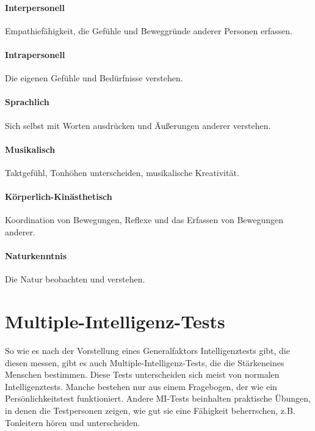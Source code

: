 \paragraph{Interpersonell}
Empathiefähigkeit, die Gefühle und Beweggründe anderer Personen erfassen.
\paragraph{Intrapersonell}
Die eigenen Gefühle und Bedürfnisse verstehen.
\paragraph{Sprachlich}
Sich selbst mit Worten ausdrücken und Äußerungen anderer verstehen.
\paragraph{Musikalisch}
Taktgefühl, Tonhöhen unterscheiden, musikalische Kreativität.
\paragraph{Körperlich-Kinästhetisch}
Koordination von Bewegungen, Reflexe und das Erfassen von Bewegungen anderer.
\paragraph{Naturkenntnis}
Die Natur beobachten und verstehen.

\section{Multiple-Intelligenz-Tests}
So wie es nach der Vorstellung eines Generalfaktors Intelligenztests gibt, die diesen messen, gibt es auch Multiple-Intelligenz-Tests, die die \glqq Stärken\grqq eines Menschen bestimmen. Diese Tests unterscheiden sich meist von normalen Intelligenztests. Manche bestehen nur aus einem Fragebogen, der wie ein Persönlichkeitstest funktioniert.
Andere MI-Tests beinhalten praktische Übungen, in denen die Testpersonen zeigen, wie gut sie eine Fähigkeit beherrschen, z.B. Tonleitern hören und unterscheiden.
